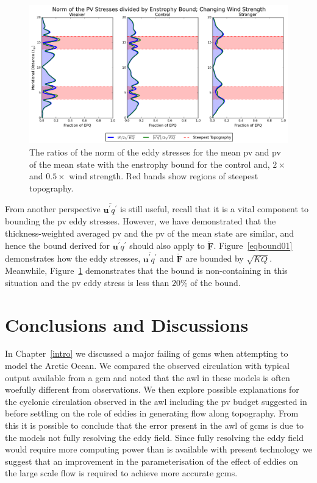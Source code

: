 \documentclass[12pt,a4paper]{report}
\newcommand*\thkmean[1]{\overline{#1}}
\newcommand*\thkres[1]{{#1}^{\prime}}
\newcommand*\spec[1]{\mathring{#1}}
\newcommand*\figref[1]{Figure~\ref{#1}}
\begin{document}
   \begin{figure}
   	\centering
   	\includegraphics[width=\linewidth]{normoverepq_0_1}
   	\caption{ The ratios of the norm of the eddy stresses for the mean \gls{pv} and
   		\gls{pv} of the mean state with the enstrophy bound for
   		the control and, $2\times$ and  $0.5\times$ wind strength. Red bands show regions of steepest topography.}
   	\label{normoverepq01}
   \end{figure}
   
   From another perspective $\thkmean{\thkres{\boldsymbol{u}}\thkres{q}}$ is still useful,
   recall that it is a vital component to bounding the \gls{pv} eddy stresses.
   However, we have demonstrated that the thickness-weighted averaged 
   \gls{pv} and the \gls{pv} of the mean state are similar, and hence the bound 
   derived for  $\thkmean{\thkres{\boldsymbol{u}}\thkres{q}}$ should also apply to $\boldsymbol{\spec{F}}$. 
   \figref{eqbound01} demonstrates how the
   eddy stresses, $\thkmean{\thkres{\boldsymbol{u}}\thkres{q}}$ and $\boldsymbol{\spec{F}}$
   are bounded by $\sqrt{KQ}$. Meanwhile, \figref{normoverepq01} demonstrates that the bound
   is non-containing in this situation and the \gls{pv} eddy stress is less than
   $20\%$ of the bound.  
   

\chapter{Conclusions and Discussions}
\label{summary}

In Chapter~\ref{intro} we discussed a major failing of \glspl{gcm} when attempting to model
the Arctic Ocean. We compared the observed circulation with typical output available 
from a \gls{gcm} and noted that the \gls{awl} in these models is often woefully 
different from observations. We then explore possible explanations for the cyclonic 
circulation observed in the  \gls{awl} including the \gls{pv} budget suggested in
\cite{yang2005arctic} before settling on the role of eddies in generating flow along
topography. From this it is possible to conclude that the error present in the \gls{awl} of \glspl{gcm} is due to the models not fully resolving the eddy field. Since fully
resolving the eddy field would require more computing power than is available with 
present technology we suggest that an improvement in the parameterisation of the effect
of eddies on the large scale flow
is required to achieve more accurate \glspl{gcm}.
\end{document}
